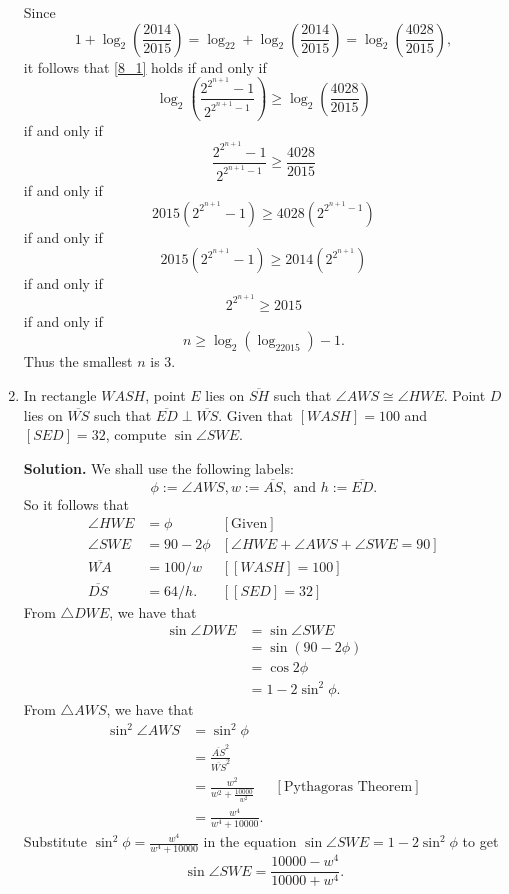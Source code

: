 \documentclass[9pt]{article}
\newcommand{\D}{\displaystyle}
\begin{document}
\begin{enumerate}
      Since
      $$1 + \log_2\left(\frac{2014}{2015}\right) = 
        \log_22 + \log_2\left(\frac{2014}{2015}\right) =
              \log_2\left(\frac{4028}{2015}\right),$$
      it follows that \eqref{8_1} holds if and only if
      $$
         \log_2\left(\frac{2^{2^{n+1}} - 1}{2^{2^{n+1}-1}}\right) \ge
            \log_2\left(\frac{4028}{2015}\right)
      $$
      if and only if
      $$\frac{2^{2^{n+1}} - 1}{2^{2^{n+1}-1}} \ge \frac{4028}{2015}$$
      if and only if
      $$2015(2^{2^{n+1}}-1) \ge 4028(2^{2^{n+1}-1})$$
      if and only if
      $$2015(2^{2^{n+1}}-1) \ge 2014(2^{2^{n+1}})$$
      if and only if
      $$2^{2^{n+1}} \ge 2015$$
      if and only if
      $$n \ge \log_2(\log_22015) - 1.$$
      Thus the smallest $n$ is 3.
   \item In rectangle $WASH$, point $E$ lies on $\overline{SH}$ such that
         $\angle AWS \cong \angle HWE$. Point $D$ lies on $\overline{WS}$ such
         that $\overline{ED} \perp \overline{WS}$. Given that $[WASH] = 100$ and
         $[SED] = 32$, compute $\sin \angle SWE$.

      \textbf{Solution.} We shall use the following labels:
      $$\phi := \angle AWS, w := \overline{AS},\text{ and } h :=\overline{ED}.$$
      So it follows that
      \begin{align*}      
         \angle HWE &= \phi &[\text{Given}] \\
         \angle SWE &= 90 - 2\phi &[\angle HWE + \angle AWS + \angle SWE = 90]\\
         \overline{WA} &= 100 / w &[[WASH] = 100] \\
         \overline{DS} &= 64 / h. &[[SED] = 32]
      \end{align*}
      From $\triangle DWE$, we have that
      \begin{align*}
         \sin \angle DWE &= \sin \angle SWE \\
            &= \sin(90 - 2\phi) \\
            &= \cos2\phi \\
            &= 1 - 2\sin^2\phi.
      \end{align*}
      From $\triangle AWS$, we have that
      \begin{align*}
         \sin^2 \angle AWS &= \sin^2 \phi \\
            &= \frac{\overline{AS}^2}{\overline{WS}^2} \\
            &= \frac{w^2}{w^2 + \D\frac{10000}{w^2}}
                  &[\text{Pythagoras Theorem}] \\
            &= \frac{w^4}{w^4+10000}.
      \end{align*}
      Substitute $\sin^2 \phi = \D\frac{w^4}{w^4+10000}$ in the equation 
      $\sin \angle SWE = 1 - 2\sin^2\phi$ to get
      \begin{equation} \label{9_1}
         \sin \angle SWE = \frac{10000 - w^4}{10000 + w^4}.
      \end{equation}


\end{enumerate}
\end{document}
